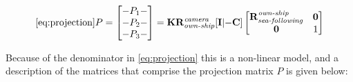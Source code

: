 \begin{equation} \ref{eq:projection}
P = \begin{bmatrix}-P_1- \\-P_2-\\-P_3- \end{bmatrix} = \mathbf{K}\mathbf{R_{\textit{own-ship}}^{\textit{camera}}}[\mathbf{I} | \mathbf{-C}]
\begin{bmatrix}
\mathbf{\mathbf{R}_{\textit{sea-following}}^{\textit{own-ship}}} &\mathbf{0}\\
\mathbf{0} &1
\end{bmatrix}
\end{equation}

Because of the denominator in \cref{eq:projection} this is a non-linear model, and a description of the matrices that comprise the projection matrix $P$ is given below:

